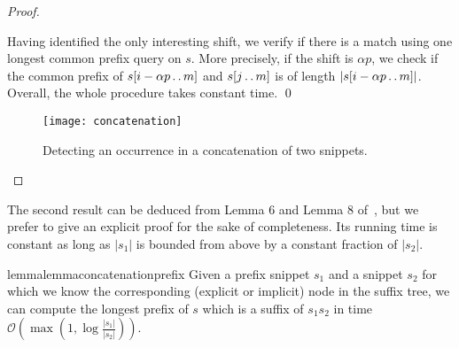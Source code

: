 \documentclass[runningheads]{llncs}
\newcommand{\twodots}{\mathinner{\ldotp\ldotp}}
\begin{document}
\begin{proof}
\begin{enumerate}
\end{enumerate}

Having identified the only interesting shift, we verify if there is a match using one longest common prefix query on $s$. More precisely, if the shift is $\alpha p$, we check if the common prefix of $s[i-\alpha p\twodots m]$ and $s[j\twodots m]$ is of length $|s[i-\alpha p\twodots m]|$. Overall, the whole procedure takes constant time.
\qed

\begin{figure}
\centering
\texttt{[image: concatenation]}
\caption{Detecting an occurrence in a concatenation of two snippets.}
\label{figure:concatenation}
\end{figure}

\end{proof}

The second result can be deduced from Lemma 6 and Lemma 8 of~\cite{GawrychowskiLZW}, but we prefer to give an explicit proof for the sake of completeness. Its running time is constant as long as $|s_1|$ is bounded from above by a constant fraction of $|s_2|$.

\begin{restatable}{lemma}{lemmaconcatenationprefix}
\label{lemma:concatenation prefix}
Given a prefix snippet $s_1$ and a snippet $s_2$ for which we know the corresponding (explicit or implicit) node in the suffix tree, we can compute the longest prefix of $s$ which is a suffix of $s_1 s_2$ in time $\mathcal{O}\left(\max\left(1,\log\frac{|s_1|}{|s_2|}\right)\right)$.
\end{restatable}
\end{document}
